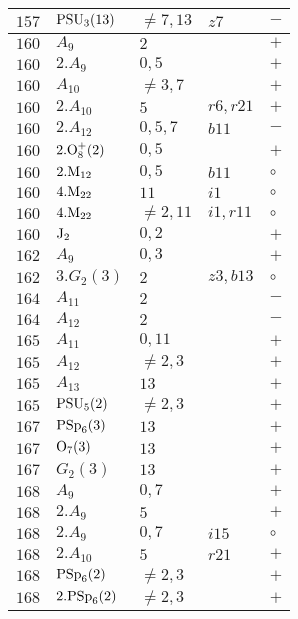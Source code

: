 \documentclass[a4paper, 11pt]{article}
\begin{document}
\begin{longtable}{lllll}
		$157$ & ${\rm PSU}_{3}(13)$ & $\neq 7,13$ & $z7$ & $-$ \\ \hline
		$160$ & $A_{9}$ & $2$ &  & $+$ \\ \hline
		$160$ & $2.A_{9}$ & $0,5$ &  & $+$ \\ \hline
		$160$ & $A_{10}$ & $\neq 3,7$ &  & $+$ \\ \hline
		$160$ & $2.A_{10}$ & $5$ & $r6, r21$ & $+$ \\ \hline
		$160$ & $2.A_{12}$ & $0,5,7$ & $b11$ & $-$ \\ \hline
		$160$ & $2.{\rm O}_{8}^+(2)$ & $0,5$ &  & $+$ \\ \hline
		$160$ & $2.{\rm M}_{12}$ & $0, 5$ & $b11$ & $\circ$ \\ \hline
		$160$ & $4.{\rm M}_{22}$ & $11$ & $i1$ & $\circ$ \\ \hline
		$160$ & $4.{\rm M}_{22}$ & $\neq 2,11$ & $i1, r11$ & $\circ$ \\ \hline
		$160$ & ${\rm J}_2$ & $0, 2$ &  & $+$ \\ \hline
		$162$ & $A_{9}$ & $0,3$ &  & $+$ \\ \hline
		$162$ & $3.G_{2}(3)$ & $2$ & $z3, b13$ & $\circ$ \\ \hline
		$164$ & $A_{11}$ & $2$ &  & $-$ \\ \hline
		$164$ & $A_{12}$ & $2$ &  & $-$ \\ \hline
		$165$ & $A_{11}$ & $0,11$ &  & $+$ \\ \hline
		$165$ & $A_{12}$ & $\neq 2,3$ &  & $+$ \\ \hline
		$165$ & $A_{13}$ & $13$ &  & $+$ \\ \hline
		$165$ & ${\rm PSU}_{5}(2)$ & $\neq 2,3$ &  & $+$ \\ \hline
		$167$ & ${\rm PSp}_{6}(3)$ & $13$ &  & $+$ \\ \hline
		$167$ & ${\rm O}_{7}(3)$ & $13$ &  & $+$ \\ \hline
		$167$ & $G_{2}(3)$ & $13$ &  & $+$ \\ \hline
		$168$ & $A_{9}$ & $0,7$ &  & $+$ \\ \hline
		$168$ & $2.A_{9}$ & $5$ &  & $+$ \\ \hline
		$168$ & $2.A_{9}$ & $0,7$ & $i15$ & $\circ$ \\ \hline
		$168$ & $2.A_{10}$ & $5$ & $r21$ & $+$ \\ \hline
		$168$ & ${\rm PSp}_{6}(2)$ & $\neq 2,3$ &  & $+$ \\ \hline
		$168$ & $2.{\rm PSp}_{6}(2)$ & $\neq 2,3$ &  & $+$ \\ \hline

\end{longtable}
\end{document}
